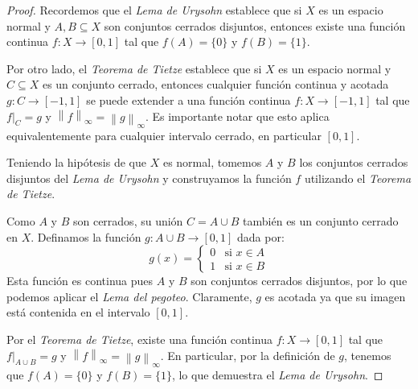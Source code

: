 \documentclass{article}
\theoremstyle{plain}
\theoremstyle{definition}
\begin{document}
\begin{proof}
    Recordemos que el \emph{Lema de Urysohn} establece que si \( X \) es un espacio normal y \( A, B \subseteq X \) son conjuntos cerrados disjuntos, entonces existe una función continua \( f : X \to [0, 1] \) tal que \( f(A) = \{0\} \) y \( f(B) = \{1\} \).

    Por otro lado, el \emph{Teorema de Tietze} establece que si \( X \) es un espacio normal y \( C \subseteq X \) es un conjunto cerrado, entonces cualquier función continua y acotada \( g : C \to [-1, 1] \) se puede extender a una función continua \( f : X \to [-1, 1] \) tal que \( f|_C = g \) y \( \left\| f \right\|_\infty = \left\| g \right\|_\infty \). Es importante notar que esto aplica equivalentemente para cualquier intervalo cerrado, en particular \( [0, 1] \).

    Teniendo la hipótesis de que \( X \) es normal, tomemos \( A \) y \( B \) los conjuntos cerrados disjuntos del \emph{Lema de Urysohn} y construyamos la función \( f \) utilizando el \emph{Teorema de Tietze}.

    Como \( A \) y \( B \) son cerrados, su unión \( C = A \cup B \) también es un conjunto cerrado en \( X \). Definamos la función \( g : A \cup B \to [0, 1] \) dada por:
    \[
        g(x) = \begin{cases}
            0 & \text{si } x \in A \\
            1 & \text{si } x \in B
        \end{cases}
    \]
    Esta función es continua pues \( A \) y \( B \) son conjuntos cerrados disjuntos, por lo que podemos aplicar el \emph{Lema del pegoteo}. Claramente, \( g \) es acotada ya que su imagen está contenida en el intervalo \( [0, 1] \).

    Por el \emph{Teorema de Tietze}, existe una función continua \( f : X \to [0, 1] \) tal que \( f|_{A \cup B} = g \) y \( \left \| f \right \|_\infty = \left \| g \right \|_\infty \). En particular, por la definición de \( g \), tenemos que \( f(A) = \{0\} \) y \( f(B) = \{1\} \), lo que demuestra el \emph{Lema de Urysohn}.
\end{proof}
\end{document}
